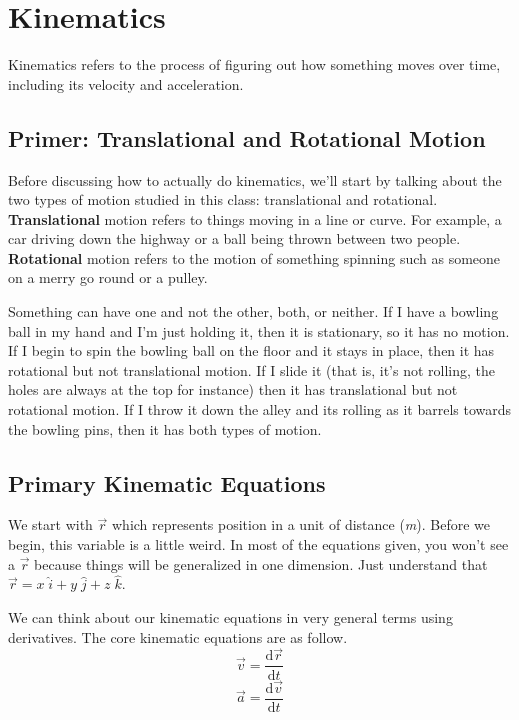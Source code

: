 \section{Kinematics}
Kinematics refers to the process of figuring out how something moves over time, including its velocity and acceleration.

\subsection{Primer: Translational and Rotational Motion}
Before discussing how to actually do kinematics, we'll start by talking about the two types of motion studied in this class: translational and rotational.
\textbf{Translational} motion refers to things moving in a line or curve. For example, a car driving down the highway or a ball being thrown between two 
people. \textbf{Rotational} motion refers to the motion of something spinning such as someone on a merry go round or a pulley. 

Something can have one and not the other, both, or neither. If I have a bowling ball in my hand and I'm just holding it, then it is stationary, so
it has no motion. If I begin to spin the bowling ball on the floor and it stays in place, then it has rotational but not translational motion. If I
slide it (that is, it's not rolling, the holes are always at the top for instance) then it has translational but not rotational motion. If I throw it
down the alley and its rolling as it barrels towards the bowling pins, then it has both types of motion.

\subsection{Primary Kinematic Equations}
We start with $\vec{r}$ which represents position in a unit of distance (\textit{m}). Before we begin, this variable is a little weird. In most of the
equations given, you won't see a $\vec{r}$ because things will be generalized in one dimension. Just understand that $\vec{r} = x \; \hat{i} + 
y \; \hat{j} + z \; \hat{k}$.

We can think about our kinematic equations in very general terms using derivatives. The core kinematic equations are as follow.
\begin{equation}
    \vec{v} = \frac{\mathrm{d}\vec{r}}{\mathrm{d}t}
\end{equation}
\begin{equation}
    \vec{a} = \frac{\mathrm{d}\vec{v}}{\mathrm{d}t}
    \end{equation}

